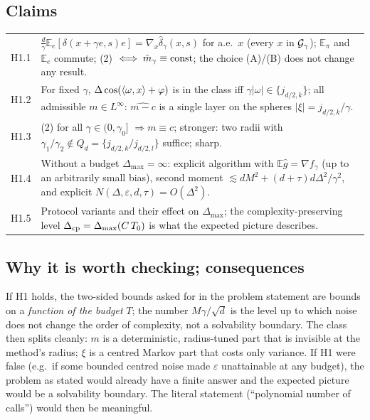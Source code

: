 \documentclass[11pt,a4paper]{article}
\numberwithin{equation}{section}
\theoremstyle{definition}
\theoremstyle{remark}
\newcommand{\E}{\mathbb E}\newcommand{\R}{\mathbb R}\newcommand{\N}{\mathbb N}\newcommand{\Prob}{\mathbb P}
\newcommand{\Dmax}{\Delta_{\max}}\newcommand{\Dcp}{\Delta_{\rm cp}}
\begin{document}
\subsection{Claims}
\begin{center}\small
\begin{tabularx}{\textwidth}{@{}lX@{}}
\toprule
H1.1 & $\frac d\gamma\E_e[\delta(x+\gamma e,s)e]=\nabla_x\hat\delta_\gamma(x,s)$ for a.e.\ $x$ (every $x$ in $\mathcal G_\gamma$); $\E_\pi$ and $\E_e$ commute; (2) $\iff\hat m_\gamma\equiv{\rm const}$; the choice (A)/(B) does not change any result. \\
H1.2 & For fixed $\gamma$, $\Delta\cos(\langle \omega,x\rangle+\varphi)$ is in the class iff $\gamma|\omega|\in\{j_{d/2,k}\}$; all admissible $m\in L^\infty$: $\widehat{m-c}$ is a single layer on the spheres $|\xi|=j_{d/2,k}/\gamma$. \\
H1.3 & (2) for all $\gamma\in(0,\gamma_0]$ $\Rightarrow m\equiv c$; stronger: two radii with $\gamma_1/\gamma_2\notin Q_d=\{j_{d/2,k}/j_{d/2,l}\}$ suffice; sharp. \\
H1.4 & Without a budget $\Dmax=\infty$: explicit algorithm with $\E\hat g=\nabla f_\gamma$ (up to an arbitrarily small bias), second moment $\lesssim dM^2+(d+\tau)d\Delta^2/\gamma^2$, and explicit $N(\Delta,\varepsilon,d,\tau)=O(\Delta^2)$. \\
H1.5 & Protocol variants and their effect on $\Dmax$; the complexity-preserving level $\Dcp=\Dmax(C\,T_0)$ is what the expected picture describes. \\
\bottomrule
\end{tabularx}
\end{center}

\subsection{Why it is worth checking; consequences}
If H1 holds, the two-sided bounds asked for in the problem statement are bounds on a \emph{function of the budget} $T$; the number $M\gamma/\sqrt d$ is the level up to which noise does not change the order of complexity, not a solvability boundary.
The class then splits cleanly: $m$ is a deterministic, radius-tuned part that is invisible at the method's radius; $\xi$ is a centred Markov part that costs only variance.
If H1 were false (e.g.\ if some bounded centred noise made $\varepsilon$ unattainable at any budget), the problem as stated would already have a finite answer and the expected picture would be a solvability boundary. The literal statement (``polynomial number of calls'') would then be meaningful.
\end{document}
